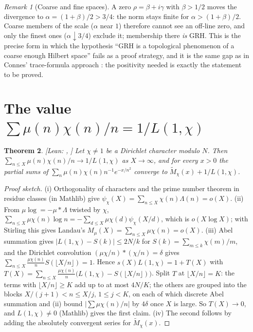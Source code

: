 \documentclass[11pt]{amsart}
\newcommand{\lean}{\path}
\newtheorem{theorem}{Theorem}[section]
\theoremstyle{definition}
\theoremstyle{remark}
\newtheorem{remark}[theorem]{Remark}
\newcommand{\Mt}{\widetilde{M}_\chi}
\newcommand{\status}[1]{\textsf{\small[#1]}}
\begin{document}
\begin{remark}[Coarse and fine spaces]
A zero $\rho=\beta+i\gamma$ with $\beta>1/2$ moves the divergence to $\alpha=(1+\beta)/2>3/4$: the norm stays finite for
$\alpha>(1+\beta)/2$. Coarse members of the scale ($\alpha$ near $1$) therefore cannot see an off-line zero, and only the
finest ones ($\alpha\downarrow3/4$) exclude it; membership there \emph{is} GRH. This is the precise form in which the
hypothesis ``GRH is a topological phenomenon of a coarse enough Hilbert space'' fails as a proof strategy, and it is
the same gap as in Connes' trace-formula approach \cite{Connes}: the positivity needed is exactly the statement to be
proved.
\end{remark}

\section{The value $\sum\mu(n)\chi(n)/n=1/L(1,\chi)$}\label{sec:musum}

\begin{theorem}\label{thm:musum}\status{Lean: \lean{tendsto_sum_mu_div}, \lean{tendsto_M_partial}}
Let $\chi\ne1$ be a Dirichlet character modulo $N$. Then $\sum_{n\le X}\mu(n)\chi(n)/n\to1/L(1,\chi)$ as $X\to\infty$,
and for every $x>0$ the partial sums of $\sum_n\mu(n)\chi(n)n^{-1}e^{-x/n^2}$ converge to $\Mt(x)+1/L(1,\chi)$.
\end{theorem}

\begin{proof}[Proof sketch]
(i) Orthogonality of characters and the prime number theorem in residue classes (in Mathlib) give
$\psi_\chi(X)=\sum_{n\le X}\chi(n)\Lambda(n)=o(X)$. (ii) From $\mu\log=-\mu*\Lambda$ twisted by $\chi$,
$\sum_{n\le X}\mu\chi(n)\log n=-\sum_{d\le X}\mu\chi(d)\psi_\chi(X/d)$, which is $o(X\log X)$; with Stirling this gives
Landau's $M_\mu(X)=\sum_{n\le X}\mu\chi(n)=o(X)$. (iii) Abel summation gives $|L(1,\chi)-S(k)|\le2N/k$ for
$S(k)=\sum_{m\le k}\chi(m)/m$, and the Dirichlet convolution $(\mu\chi/n)*(\chi/n)=\delta$ gives
$\sum_{n\le X}\frac{\mu\chi(n)}{n}S(\lfloor X/n\rfloor)=1$. Hence $s(X)L(1,\chi)=1+T(X)$ with
$T(X)=\sum_{n\le X}\frac{\mu\chi(n)}{n}\bigl(L(1,\chi)-S(\lfloor X/n\rfloor)\bigr)$. Split $T$ at $\lfloor X/n\rfloor=K$:
the terms with $\lfloor X/n\rfloor\ge K$ add up to at most $4N/K$; the others are grouped into the blocks
$X/(j+1)<n\le X/j$, $1\le j<K$, on each of which discrete Abel summation and (ii) bound
$|\sum\mu\chi(n)/n|$ by $4\delta$ once $X$ is large. So $T(X)\to0$, and $L(1,\chi)\ne0$ (Mathlib) gives the first claim.
(iv) The second follows by adding the absolutely convergent series for $\Mt(x)$.
\end{proof}
\end{document}
